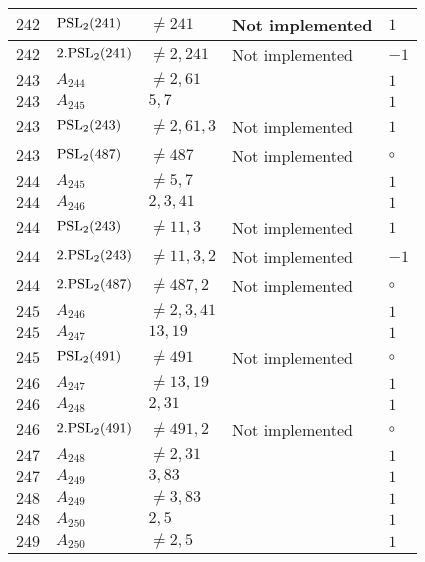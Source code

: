 \documentclass[a4paper, 11pt]{article}
\begin{document}
\begin{longtable}{lllll}
        $ 242 $ & $ {\rm PSL}_{2}(241) $ & $ \neq 241 $ & Not implemented & $ 1  $ \\ \hline
        $ 242 $ & $ 2.{\rm PSL}_{2}(241) $ & $ \neq 2, 241 $ & Not implemented & $ -1  $ \\ \hline
        $ 243 $ & $ A_{244} $ & $ \neq 2, 61 $ & $ ~ $ & $ 1  $ \\ \hline
        $ 243 $ & $ A_{245} $ & $ 5, 7 $ & $ ~ $ & $ 1  $ \\ \hline
        $ 243 $ & $ {\rm PSL}_{2}(243) $ & $ \neq 2, 61, 3 $ & Not implemented & $ 1  $ \\ \hline
        $ 243 $ & $ {\rm PSL}_{2}(487) $ & $ \neq 487 $ & Not implemented & $\circ$ \\ \hline
        $ 244 $ & $ A_{245} $ & $ \neq 5, 7 $ & $ ~ $ & $ 1  $ \\ \hline
        $ 244 $ & $ A_{246} $ & $ 2, 3, 41 $ & $ ~ $ & $ 1  $ \\ \hline
        $ 244 $ & $ {\rm PSL}_{2}(243) $ & $ \neq 11, 3 $ & Not implemented & $ 1  $ \\ \hline
        $ 244 $ & $ 2.{\rm PSL}_{2}(243) $ & $ \neq 11, 3, 2 $ & Not implemented & $ -1  $ \\ \hline
        $ 244 $ & $ 2.{\rm PSL}_{2}(487) $ & $ \neq 487, 2 $ & Not implemented & $\circ$ \\ \hline
        $ 245 $ & $ A_{246} $ & $ \neq 2, 3, 41 $ & $ ~ $ & $ 1  $ \\ \hline
        $ 245 $ & $ A_{247} $ & $ 13, 19 $ & $ ~ $ & $ 1  $ \\ \hline
        $ 245 $ & $ {\rm PSL}_{2}(491) $ & $ \neq 491 $ & Not implemented & $\circ$ \\ \hline
        $ 246 $ & $ A_{247} $ & $ \neq 13, 19 $ & $ ~ $ & $ 1  $ \\ \hline
        $ 246 $ & $ A_{248} $ & $ 2, 31 $ & $ ~ $ & $ 1  $ \\ \hline
        $ 246 $ & $ 2.{\rm PSL}_{2}(491) $ & $ \neq 491, 2 $ & Not implemented & $\circ$ \\ \hline
        $ 247 $ & $ A_{248} $ & $ \neq 2, 31 $ & $ ~ $ & $ 1  $ \\ \hline
        $ 247 $ & $ A_{249} $ & $ 3, 83 $ & $ ~ $ & $ 1  $ \\ \hline
        $ 248 $ & $ A_{249} $ & $ \neq 3, 83 $ & $ ~ $ & $ 1  $ \\ \hline
        $ 248 $ & $ A_{250} $ & $ 2, 5 $ & $ ~ $ & $ 1  $ \\ \hline
        $ 249 $ & $ A_{250} $ & $ \neq 2, 5 $ & $ ~ $ & $ 1  $ \\ \hline

\end{longtable}
\end{document}

